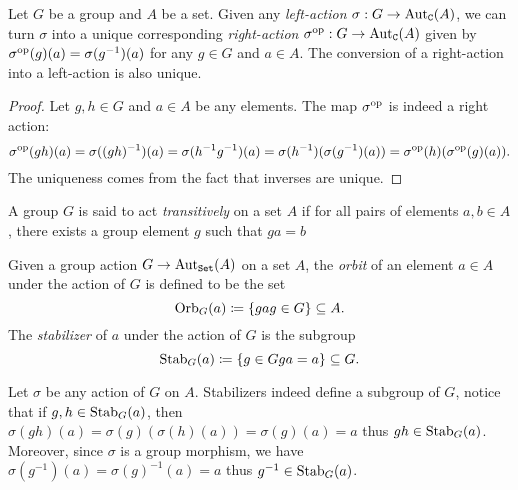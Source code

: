 \begin{proposition}
    \label{prop:left-and-right-actions}
    Let \(G\) be a group and \(A\) be a set. Given any \emph{left-action}
    \(\sigma: G \to \operatorname{Aut}_{\texttt C}(A)\), we can turn \(\sigma\) into a unique
    corresponding \emph{right-action} \(\sigma^{\mathrm{op}}: G \to \operatorname{Aut}_{\texttt C}(A)\) given
    by \(\sigma^{\mathrm{op}}(g)(a) = \sigma(g^{-1})(a)\) for any \(g \in G\) and
    \(a \in A\). The conversion of a right-action into a left-action is also unique.
\end{proposition}

\begin{proof}
    Let \(g, h \in G\) and \(a \in A\) be any elements. The map \(\sigma^{\mathrm{op}}\) is
    indeed a right action:
    \[
        \sigma^{\mathrm{op}}(g h)(a)
        = \sigma((gh)^{-1})(a)
        = \sigma(h^{-1} g^{-1})(a)
        = \sigma(h^{-1})(\sigma(g^{-1})(a))
        = \sigma^{\mathrm{op}}(h)(\sigma^{\mathrm{op}}(g)(a)).
    \]
    The uniqueness comes from the fact that inverses are unique.
\end{proof}

\begin{definition}
    \label{def:transitive-action}
    A group \(G\) is said to act \emph{transitively} on a set \(A\) if for all pairs
    of elements \(a, b \in A\), there exists a group element \(g\) such that
    \(g a = b\)
\end{definition}

\begin{definition}
    \label{def:orbit-and-stabilizer}
    Given a group action \(G \to \operatorname{Aut}_{{\texttt{Set}}}(A)\) on a set \(A\), the \emph{orbit}
    of an element \(a \in A\) under the action of \(G\) is defined to be the
    set
    \[
        \operatorname{Orb}_G(a) \coloneq \{g a \relax g \in G\} \subseteq A.
    \]
    The \emph{stabilizer} of \(a\) under the action of \(G\) is the subgroup
    \[
        \operatorname{Stab}_G(a) \coloneq \{g \in G \relax g a = a\} \subseteq G.
    \]
\end{definition}

Let \(\sigma\) be any action of \(G\) on \(A\). Stabilizers indeed define a
subgroup of \(G\), notice that if \(g, h \in \operatorname{Stab}_G(a)\), then
\(\sigma(g h)(a) = \sigma(g)(\sigma(h)(a)) = \sigma(g)(a) = a\) thus
\(g h \in \operatorname{Stab}_G(a)\). Moreover, since \(\sigma\) is a group morphism, we have
\(\sigma(g^{-1})(a) = \sigma(g)^{-1}(a) = a\) thus \(g^{-1} \in
\operatorname{Stab}_G(a)\).

